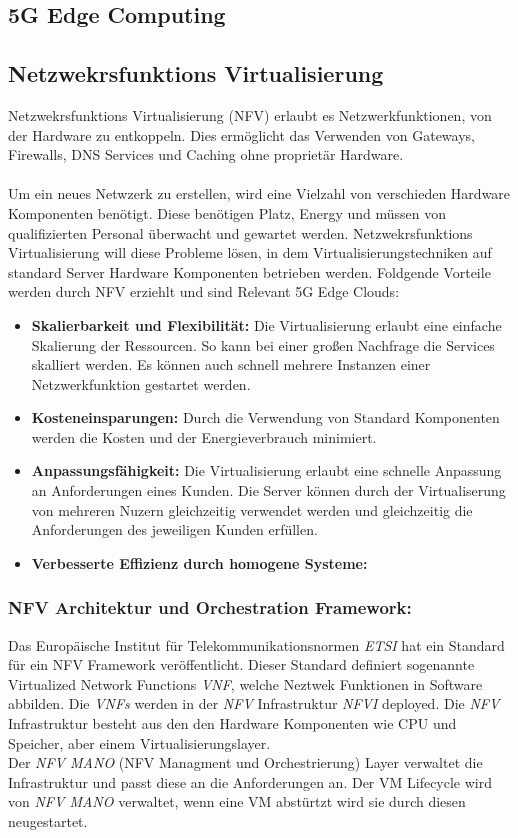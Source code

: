 \documentclass[runningheads]{llncs}
\numberwithin{figure}{section}
\begin{document}
\subsection{5G Edge Computing}
\label{subsec:5G Edge Computing}
\subsection{Netzwekrsfunktions Virtualisierung}
\label{subsec:Netzwekrsfunktions Virtualisierung}
Netzwekrsfunktions Virtualisierung (NFV) erlaubt es Netzwerkfunktionen, von der Hardware zu entkoppeln.
Dies ermöglicht das Verwenden von Gateways, Firewalls, DNS Services und Caching ohne proprietär Hardware.
\\
\\
Um ein neues Netwzerk zu erstellen, wird eine Vielzahl von verschieden Hardware Komponenten benötigt. 
Diese benötigen Platz, Energy und müssen von qualifizierten Personal überwacht und gewartet werden. 
Netzwekrsfunktions Virtualisierung will diese Probleme lösen, in dem Virtualisierungstechniken auf standard
Server Hardware Komponenten betrieben werden. 
Foldgende Vorteile werden durch NFV erziehlt und sind Relevant 5G Edge Clouds: \cite{nfv_wp}
\begin{itemize}
  \item \textbf{Skalierbarkeit und Flexibilität:} Die Virtualisierung erlaubt eine einfache Skalierung der Ressourcen.
  So kann bei einer großen Nachfrage die Services skalliert werden. Es können auch schnell mehrere Instanzen einer Netzwerkfunktion gestartet werden.
  \item \textbf{Kosteneinsparungen:} Durch die Verwendung von Standard Komponenten werden die Kosten und der Energieverbrauch minimiert.
  \item \textbf{Anpassungsfähigkeit:} Die Virtualisierung erlaubt eine schnelle Anpassung an Anforderungen eines Kunden. 
  Die Server können durch der Virtualiserung von mehreren Nuzern gleichzeitig verwendet werden und gleichzeitig die Anforderungen des jeweiligen
  Kunden erfüllen.
  \item \textbf{Verbesserte Effizienz durch homogene Systeme:}
\end{itemize}


\subsubsection{NFV Architektur und Orchestration Framework:}
Das Europäische Institut für Telekommunikationsnormen \textit{ETSI} hat ein Standard für ein NFV Framework veröffentlicht.
Dieser Standard definiert sogenannte Virtualized Network Functions \textit{VNF}, welche Neztwek Funktionen in Software abbilden.
Die \textit{VNFs} werden in der \textit{NFV} Infrastruktur \textit{NFVI} deployed. Die \textit{NFV} Infrastruktur besteht aus den
den Hardware Komponenten wie CPU und Speicher, aber einem Virtualisierungslayer. \\
Der \textit{NFV MANO} (NFV Managment und Orchestrierung) Layer verwaltet die Infrastruktur und passt diese an die Anforderungen an.
Der VM Lifecycle wird von \textit{NFV MANO} verwaltet, wenn eine VM abstürtzt wird sie durch diesen neugestartet.
\end{document}
